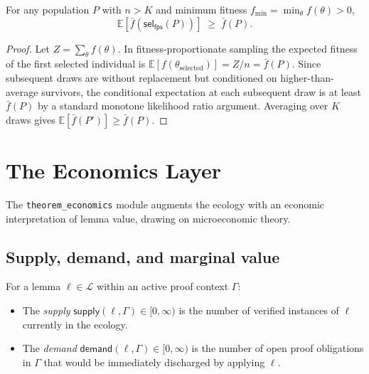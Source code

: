 \documentclass[11pt]{article}
\providecommand{\fit}{f}                    %
\providecommand{\fitbar}{\bar{f}}           %
\providecommand{\Cap}{K}                    %
\providecommand{\Lem}{\mathcal{L}}          %
\providecommand{\sel}{\mathsf{sel}}         %
\providecommand{\supp}{\mathsf{supply}}     %
\providecommand{\dem}{\mathsf{demand}}      %
\providecommand{\fitprop}{\mathsf{fps}}     %
\begin{document}
\begin{lemma}
\label{lem:selection-mean}
For any population $P$ with $n > \Cap$ and minimum fitness
$\fit_{\min} = \min_\theta \fit(\theta) > 0$,
\[
  \mathbb{E}[\fitbar(\sel_{\fitprop}(P))]
  \;\geq\; \fitbar(P).
\]
\end{lemma}
\begin{proof}
Let $Z = \sum_\theta \fit(\theta)$.  In fitness-proportionate
sampling the expected fitness of the first selected individual is
$\mathbb{E}[\fit(\theta_{\text{selected}})] = Z/n = \fitbar(P)$.
Since subsequent draws are without replacement but conditioned on
higher-than-average survivors, the conditional expectation at each
subsequent draw is at least $\fitbar(P)$ by a standard monotone
likelihood ratio argument.  Averaging over $\Cap$ draws gives
$\mathbb{E}[\fitbar(P')] \geq \fitbar(P)$.
\end{proof}

\section{The Economics Layer}\label{sec:economics}

The \texttt{theorem\_economics} module augments the ecology with an
economic interpretation of lemma value, drawing on microeconomic
theory.

\subsection{Supply, demand, and marginal value}

\begin{definition}\label{def:supply-demand}
For a lemma $\ell \in \Lem$ within an active proof context $\Gamma$:
\begin{itemize}[leftmargin=1.5em]
  \item The \emph{supply} $\supp(\ell, \Gamma) \in [0,\infty)$ is the
    number of verified instances of $\ell$ currently in the ecology.
  \item The \emph{demand} $\dem(\ell, \Gamma) \in [0,\infty)$ is the
    number of open proof obligations in $\Gamma$ that would be
    immediately discharged by applying $\ell$.
\end{itemize}
\end{definition}
\end{document}
